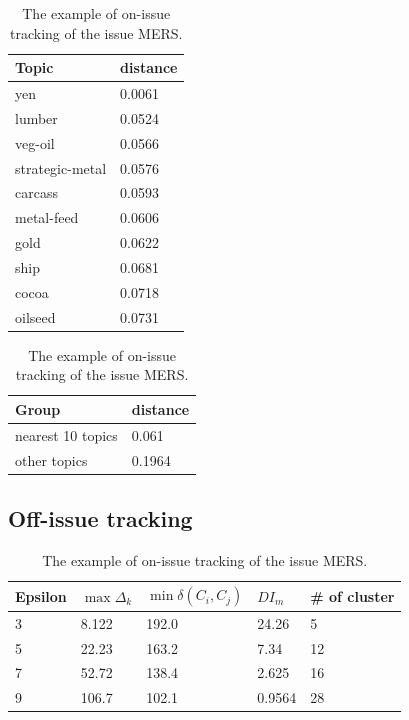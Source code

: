 \begin{table}[!htbp]
  \begin{tabular}{l|l}
  Topic & distance \\ \hline
  yen & 0.0061 \\
  lumber & 0.0524 \\
  veg-oil & 0.0566 \\
  strategic-metal & 0.0576 \\
  carcass & 0.0593 \\
  metal-feed & 0.0606 \\
  gold & 0.0622 \\
  ship & 0.0681 \\
  cocoa & 0.0718 \\
  oilseed & 0.0731
  \end{tabular}
  \caption{The example of on-issue tracking of the issue MERS.}
  \label{table:onissue}
\end{table}


\begin{table}[!htbp]
  \begin{tabular}{l|l}
  Group & distance \\ \hline
  nearest 10 topics & 0.061 \\
  other topics & 0.1964
  \end{tabular}
  \caption{The example of on-issue tracking of the issue MERS.}
  \label{table:onissue}
\end{table}



\subsection{Off-issue tracking}

\begin{table}[!htbp]
  \begin{tabular}{l|l|l|l|l}
  Epsilon   & $\max \Delta_{k}$ & $\min \delta(C_{i}, C_{j})$ & $DI_{m}$ & \# of cluster \\ \hline
  3 &  8.122 & 192.0 & 24.26 & 5 \\
  5 &  22.23 & 163.2 & 7.34 & 12 \\
  7 &  52.72 & 138.4 & 2.625 & 16  \\
  9 & 106.7 & 102.1 & 0.9564 & 28
  \end{tabular}
  \caption{The example of on-issue tracking of the issue MERS.}
  \label{table:onissue}
\end{table}

